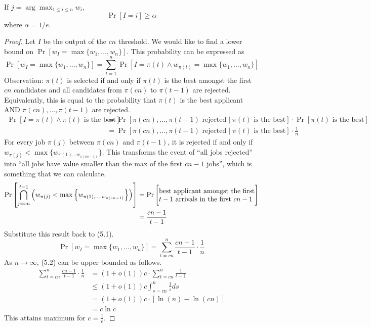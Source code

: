 \begin{theorem}
    If $j = \arg\max_{1 \leq i \leq n} w_i$,
    $$
    \Pr[I = i] \geq \alpha
    $$
    where $\alpha = 1/e$.
\end{theorem}
\begin{proof}
    Let $I$ be the output of the $cn$ threshold. We would like to find a lower bound on $\Pr[w_I = \max\{w_1,\ldots,w_n\}]$. This probability can be expressed as
    \begin{equation}
        \Pr[w_I = \max\{w_1,\ldots,w_n\}] = \sum_{t=1}^{n} \Pr[I = \pi(t) \land w_{\pi(t)} = \max\{w_1,\ldots,w_n\}]
    \end{equation}
    Observation: $\pi(t)$ is selected if and only if $\pi(t)$ is the best amongst the first $cn$ candidates and all candidates from $\pi(cn)$ to $\pi(t-1)$ are rejected. Equivalently, this is equal to the probability that $\pi(t)$ is the best applicant AND $\pi(cn),\ldots,\pi(t-1)$ are rejected.
    $$
    \begin{aligned}
        \Pr[I = \pi(t) \land \text{$\pi(t)$ is the best}] &= \Pr[\text{$\pi(cn),\ldots,\pi(t-1)$ rejected} \mid \text{$\pi(t)$ is the best}] \cdot \Pr[\text{$\pi(t)$ is the best}] \\
        &= \Pr[\text{$\pi(cn),\ldots,\pi(t-1)$ rejected} \mid \text{$\pi(t)$ is the best}] \cdot \frac{1}{n}
    \end{aligned}
    $$
    For every job $\pi(j)$ between $\pi(cn)$ and $\pi(t-1)$, it is rejected if and only if $w_{\pi(j)} < \max\{w_{\pi(1) \ldots w_{\pi(cn-1)}}\}$. This transforms the event of ``all jobs rejected'' into ``all jobs have value smaller than the max of the first $cn-1$ jobs'', which is something that we can calculate.
    $$
    \begin{aligned}
        \Pr\left[ \bigcap_{j=cn}^{t-1} \left( w_{\pi(j)} < \max\left\{w_{\pi(1),\ldots,w_{\pi(cn-1)}}\right\} \right) \right] &= \Pr\Bigg[ \parbox{14em}{ best applicant amongst the first $t-1$ arrivals in the first $cn-1$} \Bigg] \\
        &= \frac{cn-1}{t-1}
    \end{aligned}
    $$
    Substitute this result back to (5.1).
    \begin{equation}
        \Pr[w_I = \max\{w_1,\ldots,w_n\}] = \sum_{t=cn}^{n} \frac{cn-1}{t-1} \cdot \frac{1}{n}
    \end{equation}
    As $n \to \infty$, (5.2) can be upper bounded as follows.
    $$
    \begin{aligned}
        \sum_{t=cn}^{n} \frac{cn-1}{t-1} \cdot \frac{1}{n} &= (1+o(1)) c \cdot \sum_{t=cn}^{n} \frac{1}{t-1} \\
        &\leq (1 + o(1))c \int_{s=cn}^n \frac{1}{s} ds \\
        &= (1+o(1))c \cdot \left[ \ln(n) - \ln(cn) \right] \\
        &= c \ln c
    \end{aligned}
    $$
    This attains maximum for $c = \frac{1}{e}$.
\end{proof}

